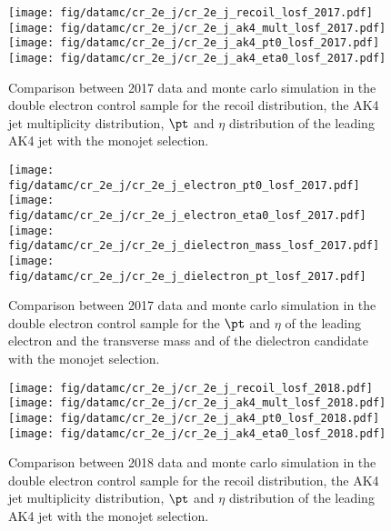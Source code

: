 {\begin{figure}[htbp]
    \begin{center}
        \texttt{[image: fig/datamc/cr\_2e\_j/cr\_2e\_j\_recoil\_losf\_2017.pdf]}
        \texttt{[image: fig/datamc/cr\_2e\_j/cr\_2e\_j\_ak4\_mult\_losf\_2017.pdf]} \\
        \texttt{[image: fig/datamc/cr\_2e\_j/cr\_2e\_j\_ak4\_pt0\_losf\_2017.pdf]}
        \texttt{[image: fig/datamc/cr\_2e\_j/cr\_2e\_j\_ak4\_eta0\_losf\_2017.pdf]}
    \end{center}
    \caption{Comparison between 2017 data and monte carlo simulation in the double electron control sample for
        the recoil distribution, the AK4 jet multiplicity distribution,  $\pt$ and $\eta$ distribution
        of the leading AK4  jet with the monojet selection.}
    \label{fig:DE_monojet_2017}
\end{figure}

\begin{figure}[htbp]
    \begin{center}
        \texttt{[image: fig/datamc/cr\_2e\_j/cr\_2e\_j\_electron\_pt0\_losf\_2017.pdf]}
        \texttt{[image: fig/datamc/cr\_2e\_j/cr\_2e\_j\_electron\_eta0\_losf\_2017.pdf]} \\
        \texttt{[image: fig/datamc/cr\_2e\_j/cr\_2e\_j\_dielectron\_mass\_losf\_2017.pdf]}
        \texttt{[image: fig/datamc/cr\_2e\_j/cr\_2e\_j\_dielectron\_pt\_losf\_2017.pdf]}
    \end{center}
    \caption{Comparison between 2017 data and monte carlo simulation in the double electron control sample for
        the $\pt$ and $\eta$ of the leading electron and the transverse mass and \pt of the dielectron candidate with the monojet selection.}
    \label{fig:DE2_monojet_2017}
\end{figure}

\begin{figure}[htbp]
    \begin{center}
        \texttt{[image: fig/datamc/cr\_2e\_j/cr\_2e\_j\_recoil\_losf\_2018.pdf]}
        \texttt{[image: fig/datamc/cr\_2e\_j/cr\_2e\_j\_ak4\_mult\_losf\_2018.pdf]} \\
        \texttt{[image: fig/datamc/cr\_2e\_j/cr\_2e\_j\_ak4\_pt0\_losf\_2018.pdf]}
        \texttt{[image: fig/datamc/cr\_2e\_j/cr\_2e\_j\_ak4\_eta0\_losf\_2018.pdf]}
    \end{center}
    \caption{Comparison between 2018 data and monte carlo simulation in the double electron control sample for
        the recoil distribution, the AK4 jet multiplicity distribution,  $\pt$ and $\eta$ distribution
        of the leading AK4  jet with the monojet selection.}
    \label{fig:DE_monojet_2018}
\end{figure}

}
